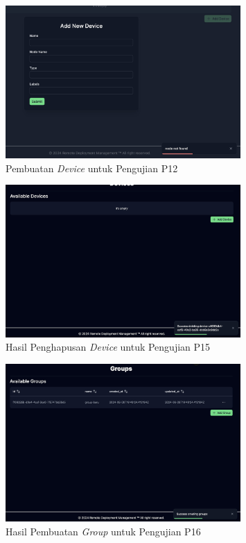 \begin{figure}[ht]
  \centering
  \includegraphics[width=0.8\textwidth]{resources/chapter-4/pengujian/p12-failed.jpg}
  \caption{Pembuatan \textit{Device} untuk Pengujian P12}
  \label{fig:pengujian-p12-failed}
\end{figure}

\begin{figure}[ht]
  \centering
  \includegraphics[width=0.8\textwidth]{resources/chapter-4/pengujian/p14.jpg}
  \caption{Hasil Penghapusan \textit{Device} untuk Pengujian P15}
  \label{fig:pengujian-p15}
\end{figure}

\begin{figure}[ht]
  \centering
  \includegraphics[width=0.8\textwidth]{resources/chapter-4/pengujian/p16.jpg}
  \caption{Hasil Pembuatan \textit{Group} untuk Pengujian P16}
  \label{fig:pengujian-p16}
\end{figure}

